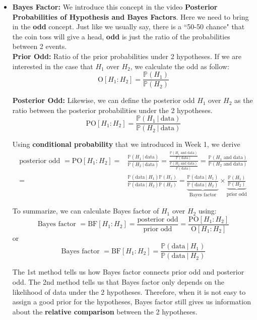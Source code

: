 \documentclass{article}
\def\dsst{\displaystyle}
\begin{document}
\begin{itemize}
	\item \textbf{Bayes Factor: }We introduce this concept in the video \textbf{Posterior Probabilities of Hypothesis and Bayes Factors}. Here we need to bring in the \textbf{odd} concept. Just like we usually say, there is a ``50-50 chance" that the coin toss will give a head, \textbf{odd} is just the ratio of the probabilities between 2 events. \\
	
	\textbf{Prior Odd:} Ratio of the prior probabilities under 2 hypotheses. If we are interested in the case that $H_1$ over $H_2$, we calculate the odd as follow:
	$$ \text{O}[H_1:H_2] = \frac{\mathbb{P}(H_1)}{\mathbb{P}(H_2)} $$
	
	\textbf{Posterior Odd:} Likewise, we can define the posterior odd $H_1$ over $H_2$ as the ratio between the posterior probabilities under the 2 hypotheses.
	$$ \text{PO}[H_1:H_2] = \frac{\mathbb{P}(H_1~|~\text{data})}{\mathbb{P}(H_2~|~\text{data})} $$
	
	Using \textbf{conditional probability} that we introduced in Week 1, we derive 
	\begin{align*} 
	\text{posterior odd }= \text{PO}[H_1:H_2] = &  \frac{\mathbb{P}(H_1~|~\text{data})}{\mathbb{P}(H_2~|~\text{data})} = \frac{\dsst \frac{\mathbb{P}(H_1\text{ and data})}{\mathbb{P}(\text{data})}}{\dsst \frac{\mathbb{P}(H_2\text{ and data})}{\mathbb{P}(\text{data})}} = \frac{\mathbb{P}(H_1\text{ and data})}{\mathbb{P}(H_2\text{ and data})} \\
	= & \frac{\mathbb{P}(\text{data}~|~H_1)\mathbb{P}(H_1)}{\mathbb{P}(\text{data}~|~H_2)\mathbb{P}(H_2)} = \underbrace{\frac{\mathbb{P}(\text{data}~|~H_1)}{\mathbb{P}(\text{data}~|~H_2)}}_\text{Bayes factor} \times \underbrace{\frac{\mathbb{P}(H_1)}{\mathbb{P}(H_2)}}_\text{prior odd}
	\end{align*}
	
	To summarize, we can calculate Bayes factor of $H_1$ over $H_2$ using:
	$$ \text{Bayes factor } = \text{BF}[H_1:H_2] = \frac{\text{posterior odd}}{\text{prior odd}} = \frac{\text{PO}[H_1:H_2]}{\text{O}[H_1:H_2]} $$
	or
	$$ \text{Bayes factor } = \text{BF}[H_1:H_2] = \frac{\mathbb{P}(\text{data}~|~H_1)}{\mathbb{P}(\text{data}~|~H_2)} $$
	
	The 1st method tells us how Bayes factor connects prior odd and posterior odd. The 2nd method tells us that Bayes factor only depends on the likelihood of data under the 2 hypotheses. Therefore, when it is not easy to assign a good prior for the hypotheses, Bayes factor still gives us information about the \textbf{relative comparison} between the 2 hypotheses. \\
	

\end{itemize}
\end{document}
